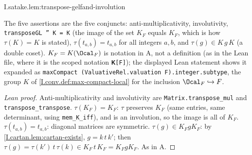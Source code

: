\begin{lemma}
\end{lemma}
\begin{tfformal}{I.satake.lem:transpose-gelfand-involution}
\begin{tffidelity}
The five assertions are the five conjuncts: anti-multiplicativity, involutivity, \texttt{transposeGL '' K = K} (the image of the set $K_F$ equals $K_F$, which is how $\tau(K)=K$ is stated), $\tau(t_{a,b})=t_{a,b}$ for all integers $a,b$, and $\tau(g)\in K\,g\,K$ (a double coset). $K_F=K(\Ocal_F)$ is notation in A, not a definition (as in the Lean file, where it is the scoped notation \texttt{𝐊[F]}); the displayed Lean statement shows it expanded as \texttt{maxCompact (ValuativeRel.valuation F).integer.subtype}, the group $K$ of \cref{I.conv.def:max-compact-local} for the inclusion $\Ocal_F\hookrightarrow F$.
\end{tffidelity}
\end{tfformal}
\begin{proof}[Lean proof]
Anti-multiplicativity and involutivity are \texttt{Matrix.transpose\_mul} and \texttt{transpose\_transpose}. $\tau(K_F)=K_F$: $\tau$ preserves $K_F$ (same entries, same determinant, using \texttt{mem\_K\_iff}), and is an involution, so the image is all of $K_F$. $\tau(t_{a,b})=t_{a,b}$: diagonal matrices are symmetric. $\tau(g)\in K_FgK_F$: by \cref{I.cartan.lem:cartan-exists}, $g=k\,t\,k'$; then $\tau(g)=\tau(k')\,t\,\tau(k)\in K_F\,t\,K_F=K_FgK_F$. As in A.
\end{proof}

